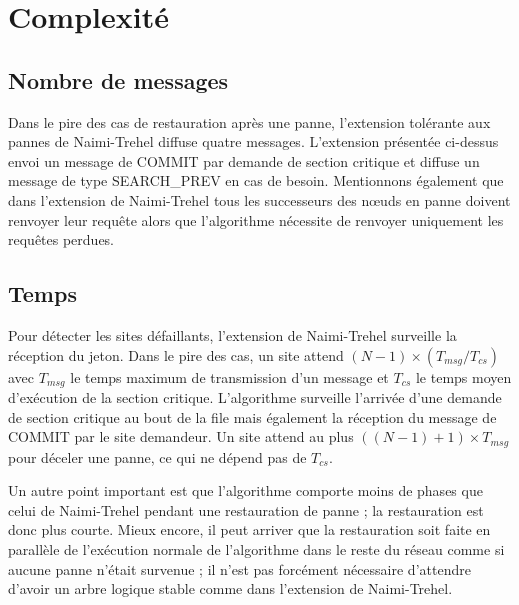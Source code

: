 \section{Complexité}

\subsection{Nombre de messages}
Dans le pire des cas de restauration après une panne, l'extension tolérante aux pannes de Naimi-Trehel \cite{naimi1988} diffuse quatre messages. L'extension présentée ci-dessus envoi un message de COMMIT par demande de section critique et diffuse un message de type SEARCH\_PREV en cas de besoin. Mentionnons également que dans l'extension de Naimi-Trehel tous les successeurs des nœuds en panne doivent renvoyer leur requête alors que l'algorithme \cite{sopena2005} nécessite de renvoyer uniquement les requêtes perdues.

\subsection{Temps}
Pour détecter les sites défaillants, l'extension de Naimi-Trehel surveille la réception du jeton. Dans le pire des cas, un site attend $(N-1)\times(T_{msg}/T_{cs})$ avec $T_{msg}$ le temps maximum de transmission d'un message et $T_{cs}$ le temps moyen d'exécution de la section critique.
L'algorithme \cite{sopena2005} surveille l'arrivée d'une demande de section critique au bout de la file mais également la réception du message de COMMIT par le site demandeur. Un site attend au plus $((N-1)+1)\times T_{msg}$ pour déceler une panne, ce qui ne dépend pas de $T_{cs}$.

Un autre point important est que l'algorithme \cite{sopena2005} comporte moins de phases que celui de Naimi-Trehel pendant une restauration de panne ; la restauration est donc plus courte. Mieux encore, il peut arriver que la restauration soit faite en parallèle de l'exécution normale de l'algorithme dans le reste du réseau comme si aucune panne n'était survenue ; il n'est pas forcément nécessaire d'attendre d'avoir un arbre logique stable comme dans l'extension de Naimi-Trehel.


